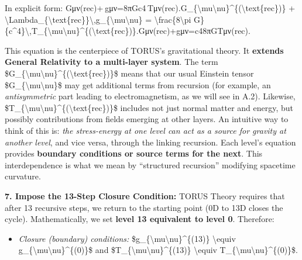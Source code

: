 \documentclass[
]{article}
\begin{document}
{In explicit form:
Gμν(rec)+\Lambdarec gμν=8πGc4 Tμν(rec).G\_\{\textbackslash mu\textbackslash nu\}\^{}\{(\textbackslash text\{rec\})\}
+
\textbackslash Lambda\_\{\textbackslash text\{rec\}\}\textbackslash,g\_\{\textbackslash mu\textbackslash nu\}
= \textbackslash frac\{8\textbackslash pi
G\}\{c\^{}4\}\textbackslash,T\_\{\textbackslash mu\textbackslash nu\}\^{}\{(\textbackslash text\{rec\})\}.Gμν(rec)\hspace{0pt}+\Lambdarec\hspace{0pt}gμν\hspace{0pt}=c48πG\hspace{0pt}Tμν(rec)\hspace{0pt}.

This equation is the centerpiece of TORUS's gravitational theory. It
\textbf{extends General Relativity to a multi-layer system}. The term
\$G\_\{\textbackslash mu\textbackslash nu\}\^{}\{(\textbackslash text\{rec\})\}\$
means that our usual Einstein tensor
\$G\_\{\textbackslash mu\textbackslash nu\}\$ may get additional terms
from recursion (for example, an \emph{antisymmetric} part leading to
electromagnetism, as we will see in A.2). Likewise,
\$T\_\{\textbackslash mu\textbackslash nu\}\^{}\{(\textbackslash text\{rec\})\}\$
includes not just normal matter and energy, but possibly contributions
from fields emerging at other layers. An intuitive way to think of this
is: \emph{the stress-energy at one level can act as a source for gravity
at another level}, and vice versa, through the linking recursion. Each
level's equation provides \textbf{boundary conditions or source terms
for the next}\hspace{0pt}. This interdependence is what we mean by
``structured recursion'' modifying spacetime curvature.

\textbf{7. Impose the 13-Step Closure Condition:} TORUS Theory requires
that after 13 recursive steps, we return to the starting point (0D to
13D closes the cycle). Mathematically, we set \textbf{level 13
equivalent to level 0}. Therefore:

\begin{itemize}
\item
  \emph{Closure (boundary) conditions:}
  \$g\_\{\textbackslash mu\textbackslash nu\}\^{}\{(13)\}
  \textbackslash equiv
  g\_\{\textbackslash mu\textbackslash nu\}\^{}\{(0)\}\$ and
  \$T\_\{\textbackslash mu\textbackslash nu\}\^{}\{(13)\}
  \textbackslash equiv
  T\_\{\textbackslash mu\textbackslash nu\}\^{}\{(0)\}\$\hspace{0pt}.
\end{itemize}

}
\end{document}
